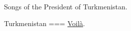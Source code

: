 Songs of the President of Turkmenistan.

Turkmenistan
===
\href{https://youtu.be/wrekZAjJ94A}{Voilà}.